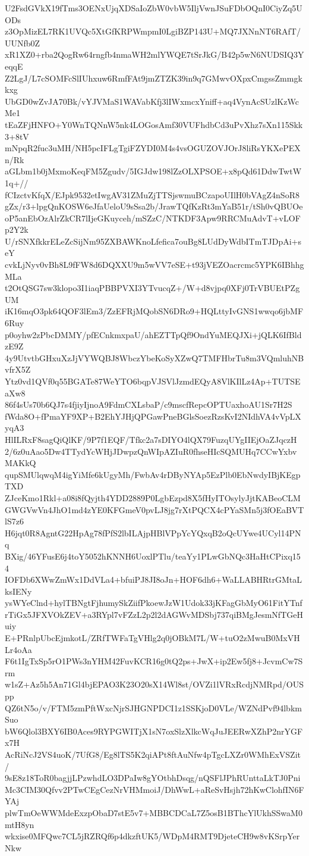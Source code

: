 U2FsdGVkX19fTms3OENxUjqXDSaIoZbW0vbW5IljVwnJSuFDbOQnI0CiyZq5UODs
z3OpMizEL7RK1UVQc5XtGfKRPWmpmI0LgiBZP143U+MQ7JXNnNT6RAfT/UUNfb0Z
xR1XZ0+rba2QogRw64rngfb4nmaWH2mlYWQE7tSrJkG/B42p5wN6NUDSIQ3YeqqE
Z2LgJ/L7cSOMFcSlIUhxuw6RmfFAt9jmZTZK39in9q7GMwvOXpxCmgssZmmgkkxg
UbGD0wZvJA70Bk/vYJVMaS1WAVabKfj3lIWxmcxYniff+aq4VynAcSUzlKzWcMe1
tEaZFjHNFO+Y0WnTQNnW5nk4LOGosAmf30VUFhdbCd3uPvXhz7sXn115Skk3+8tV
mNpqR2fuc3uMH/NH5pcIFLgTgiFZYDI0M4s4vsOGUZOVJOrJ8liRsYKXePEXn/Rk
aGLbm1b0jMxmoKeqFM5Zgudv/5IGJdw198lZzOLXPSOE+x8pQd61DdwTwtW1q+//
fCIzctvKfqX/EJpk9532etIwgAV31ZMuZjTTSjswmuBCzapoUIlH0bVAgZ4nSoR8
gZx/r3+lpgQnKOSW6eJfaUeloU9sSsa2b/JrawTQfKzRt3mYaB51r/tSh0vQBUOe
oP5anEbOzAlrZkCR7lIjeGKuyceh/mSZzC/NTKDF3Apw9RRCMuAdvT+vLOFp2Y2k
U/rSNXfkkrELeZcSijNm95ZXBAWKnoLfefica7ouBg8LUdDyWdbITmTJDpAi+seY
cvkLjNyv0vBh8L9fFW8d6DQXXU9m5wVV7eSE+t93jVEZOacrcmc5YPK6IBhhgMLa
t2OtQSG7sw3klopo3I1iaqPBBPVXI3YTvucqZ+/W+d8vjpq0XFj0TrVBUEtPZgUM
iK16mqO3pk64QOF3lEm3/ZzEFRjMQobSN6DRo9+HQLttyIvGNS1wwqo6jbMF6Ruy
p0oyhw2zPbcDMMY/pfECnkmxpaU/ahEZTTpQf9OndYuMEQJXi+jQLK6IfBldzE9Z
4y9UtvtbGHxuXzJjVYWQBJ8WbczYbeKoSyXZwQ7TMFHbrTu8m3VQmluhNBvfrX5Z
Ytz0vd1QVf0q55BGATe87WeYTO6bqpVJSVlJzmdEQyA8VlKIlLz4Ap+TUTSEaXw8
86f4sUs70b6QJ7s4fjiyIjnoA9FdmCXLsbaP/c9mscfRepcOPTUaxhoAU1Sr7H2S
fWda8O+fPmaYF9XP+B2EhYJHjQPGawPneBGlsSoezRzsKvI2NIdhVA4vVpLXyqA3
HlILRxF8sagQiQlKF/9P7f1EQF/Tfkc2a7sDIYO4lQX79FuzqUYgIIEjOaZJqczH
2/6z0uAao5Dw4TTydYcWHjJDwpzQnWIpAZIuR0fhseHIcSQMUHq7CCwYxbvMAKkQ
qupSMUlqwqM4igYiMfe6kUgyMh/FwbAv4rDByNYAp5EzPlb0EbNwdyIBjKEgpTXD
ZJceKmo1Rkl+a08i8fQyjth4YDD2889P0LgbEzpd8X5fHyITOsylyJjtKABeoCLM
GWGVwVn4JhO1md4zYE0KFGmeV0pvLJ8jg7rXtPQCX4cPYaSMn5j3fOEaBVTlS7z6
H6jqt0R8AgntG22HpAg78fPfS2lbILAjpHBlVPpYcYQxqB2oQcUYwe4UCyl14PNq
BXig/46YFusE6j4toY5052hKNNH6UoxlPTlu/teaYy1PLwGbNQc3HaHtCPixq154
IOFDb6XWwZmWx1DdVLa4+bfuiPJ8JI8oJn+HOF6dh6+WaLLABHRtrGMtaLksIENy
ysWYeClnd+hylTBNgtFjhumySkZiifPkoewJzW1Udok33jKFagGbMyO61FitYTnf
rTiGx5JFXVOkZEV+a3RYpl7vFZzL2p2l2dAGWvMDSbj737qiBMgJesmNfTGeHuiy
E+PRnlpUbcEjmkotL/ZRfTWFaTgVHlg2q0jOBkM7L/W+tuO2zMwuB0MxVHLr4oAa
F6t1IgTxSp5rO1PWs3nYHM42FuvKCR16g0tQ2ps+JwX+ip2Ew5fj8+JcvmCw7Srm
w1sZ+Az5h5An71Gl4bjEPAO3K23O20sX14Wl8st/OVZi1lVRxRcdjNMRpd/OUSpp
QZ6tN5o/v/FTM5zmPftWxcNjrSJHGNPDCI1z1SSKjoD0VLe/WZNdPvf94lbkmSuo
bW6Qlol3BXY6IB0Aces9RYPGWITjX1sN7oxSlzXlkcWqJuJEERwXZhP2nrYGFx7H
AcRiNcJ2VS4uoK/7UfG8/Eg8lTS5K2qiAPt8ftAuNfw4pTgcLXZr0WMhExVSZit/
9sE8z18ToR0bagjjLPzwhdLO3DPaIw8gYOtbhDsqg/nQSFlJPhRUnttaLkTJ0Pni
Mc3CIM30Qfvv2PTwCEgCezNrVHMmoiJ/DhWwL+aReSvHsjh72hKwClohfIN6FYAj
plwTmOeWWMdeExzpObaD7stE5v7+MBBCDCaL7Z5osB1BThcYlUkhSSwaM0mtH8yn
wkxise0MFQwc7CL5jRZRQf6p4dkzftUK5/WDpM4RMT9DjeteCH9w8vKSrpYerNkw
